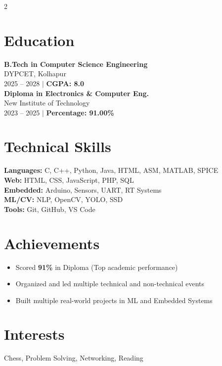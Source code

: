 \documentclass[letterpaper,10pt]{article}
\begin{document}
\begin{paracol}{2}

\section*{Education}

\textbf{B.Tech in Computer Science Engineering} \\
DYPCET, Kolhapur \\
2025 -- 2028 \quad $|$ \quad \textbf{CGPA: 8.0} \\[4pt]

\textbf{Diploma in Electronics \& Computer Eng.} \\
New Institute of Technology \\
2023 -- 2025 \quad $|$ \quad \textbf{Percentage: 91.00\%}

\section*{Technical Skills}

\textbf{Languages:} C, C++, Python, Java, HTML, ASM, MATLAB, SPICE \\
\textbf{Web:} HTML, CSS, JavaScript, PHP, SQL \\
\textbf{Embedded:} Arduino, Sensors, UART, RT Systems \\
\textbf{ML/CV:} NLP, OpenCV, YOLO, SSD \\
\textbf{Tools:} Git, GitHub, VS Code

\section*{Achievements}
\begin{itemize}
    \item Scored \textbf{91\%} in Diploma (Top academic performance)
    \item Organized and led multiple technical and non-technical events
    \item Built multiple real-world projects in ML and Embedded Systems
\end{itemize}

\section*{Interests}
Chess, Problem Solving, Networking, Reading


\end{paracol}
\end{document}
